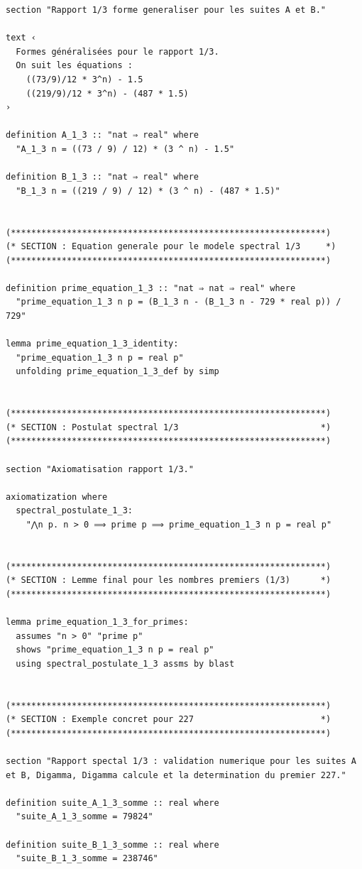 \documentclass[a4paper,11pt]{article}
\begin{document}
\begin{holcode}[title={\textcolor{white}{Fichier : methode\_spectral.thy -- Partie 1/4}}]
\begin{lstlisting}
section "Rapport 1/3 forme generaliser pour les suites A et B."

text ‹
  Formes généralisées pour le rapport 1/3.
  On suit les équations :
    ((73/9)/12 * 3^n) - 1.5
    ((219/9)/12 * 3^n) - (487 * 1.5)
›

definition A_1_3 :: "nat ⇒ real" where
  "A_1_3 n = ((73 / 9) / 12) * (3 ^ n) - 1.5"

definition B_1_3 :: "nat ⇒ real" where
  "B_1_3 n = ((219 / 9) / 12) * (3 ^ n) - (487 * 1.5)"


(**************************************************************)
(* SECTION : Equation generale pour le modele spectral 1/3     *)
(**************************************************************)

definition prime_equation_1_3 :: "nat ⇒ nat ⇒ real" where
  "prime_equation_1_3 n p = (B_1_3 n - (B_1_3 n - 729 * real p)) / 729"

lemma prime_equation_1_3_identity:
  "prime_equation_1_3 n p = real p"
  unfolding prime_equation_1_3_def by simp


(**************************************************************)
(* SECTION : Postulat spectral 1/3                            *)
(**************************************************************)

section "Axiomatisation rapport 1/3."

axiomatization where
  spectral_postulate_1_3:
    "⋀n p. n > 0 ⟹ prime p ⟹ prime_equation_1_3 n p = real p"


(**************************************************************)
(* SECTION : Lemme final pour les nombres premiers (1/3)      *)
(**************************************************************)

lemma prime_equation_1_3_for_primes:
  assumes "n > 0" "prime p"
  shows "prime_equation_1_3 n p = real p"
  using spectral_postulate_1_3 assms by blast


(**************************************************************)
(* SECTION : Exemple concret pour 227                         *)
(**************************************************************)

section "Rapport spectal 1/3 : validation numerique pour les suites A et B, Digamma, Digamma calcule et la determination du premier 227."

definition suite_A_1_3_somme :: real where
  "suite_A_1_3_somme = 79824"

definition suite_B_1_3_somme :: real where
  "suite_B_1_3_somme = 238746"


\end{lstlisting}
\end{holcode}
\end{document}

